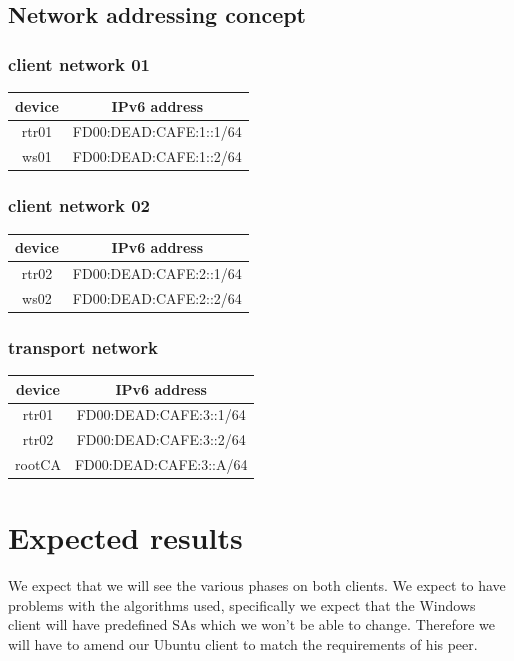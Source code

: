 \documentclass[a4paper]{report}
\begin{document}
\subsection{Network addressing concept}

{\centering
	\subsubsection{client network 01}
	\begin{tabular}{|c|c|}
		\hline 
		\textbf{device} & \textbf{IPv6 address} \\ 
		\hline 
		rtr01 & FD00:DEAD:CAFE:1::1/64 \\ 
		\hline 
		ws01 & FD00:DEAD:CAFE:1::2/64 \\ 
		\hline 
	\end{tabular} 
	
	\subsubsection{client network 02}
	\begin{tabular}{|c|c|}
		\hline 
		\textbf{device} & \textbf{IPv6 address} \\ 
		\hline 
		rtr02 & FD00:DEAD:CAFE:2::1/64 \\ 
		\hline 
		ws02 & FD00:DEAD:CAFE:2::2/64 \\ 
		\hline 
	\end{tabular} 
	
	\subsubsection{transport network}
	\begin{tabular}{|c|c|}
		\hline 
		\textbf{device} & \textbf{IPv6 address} \\ 
		\hline 
		rtr01 & FD00:DEAD:CAFE:3::1/64 \\ 
		\hline 
		rtr02 & FD00:DEAD:CAFE:3::2/64 \\ 
		\hline 
		rootCA & FD00:DEAD:CAFE:3::A/64 \\ 
		\hline 
	\end{tabular}

}

\section{Expected results}
\label{sec:ExpectedResult}
We expect that we will see the various phases on both clients. We expect to have problems with the algorithms used, specifically we expect that the Windows client will have predefined SAs which we won't be able to change. Therefore we will have to amend our Ubuntu client to match the requirements of his peer.
\end{document}
